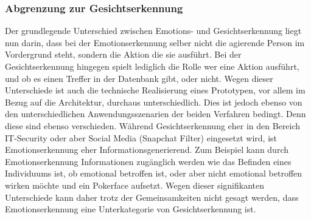 \documentclass[12pt, a4paper]{scrbook}
\begin{document}
\subsubsection{Abgrenzung zur Gesichtserkennung}
Der grundlegende Unterschied zwischen Emotions- und Gesichtserkennung liegt nun darin, dass bei der Emotionserkennung selber nicht die agierende Person im Vordergrund steht, sondern die Aktion die sie ausführt.
Bei der Gesichtserkennung hingegen spielt lediglich die Rolle wer eine Aktion ausführt, und ob es einen Treffer in der Datenbank gibt, oder nicht. Wegen dieser Unterschiede ist auch die technische Realisierung eines Prototypen, vor allem im Bezug auf die Architektur,  durchaus unterschiedlich. Dies ist jedoch ebenso von den unterschiedlichen Anwendungsszenarien der beiden Verfahren bedingt.
 Denn diese sind ebenso verschieden. Während Gesichtserkennung eher in den Bereich IT-Security oder aber Social Media (Snapchat Filter) eingesetzt wird, ist Emotionserkennung eher Informationsgenerierend.
Zum Beispiel kann durch Emotionserkennung Informationen zugänglich werden wie das Befinden eines Individuums ist, ob emotional betroffen ist, oder aber nicht emotional betroffen wirken möchte und ein Pokerface aufsetzt.
Wegen dieser signifikanten Unterschiede kann daher trotz der Gemeinsamkeiten nicht gesagt werden, dass Emotionserkennung eine Unterkategorie von Gesichtserkennung ist.
\end{document}
